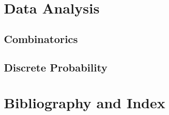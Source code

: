 \part{Data Analysis}\label{pt:data}

    \chapter{Combinatorics}\label{ch:combo}

    \chapter{Discrete Probability}\label{ch:prob}

\part*{Bibliography and Index}
\backmatter


\printindex

